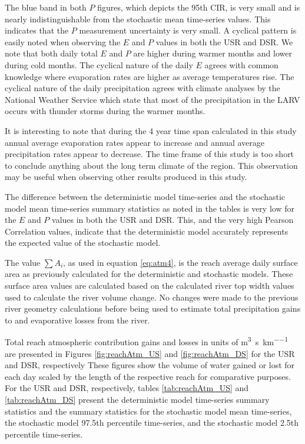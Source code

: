 \begin{linenumbers}
The blue band in both $ P $ figures, which depicts the 95th CIR, is very small and is nearly indistinguishable from the stochastic mean time-series values.  This indicates that the $ P $ measurement uncertainty is very small.  A cyclical pattern is easily noted when observing the $ E $ and $ P $ values in both the USR and DSR.  We note that both daily total $ E $ and $ P $ are higher during warmer months and lower during cold months.  The cyclical nature of the daily $ E $ agrees with common knowledge where evaporation rates are higher as average temperatures rise.  The cyclical nature of the daily precipitation agrees with climate analyses by the National Weather Service which state that most of the precipitation in the LARV occurs with thunder storms during the warmer months.

It is interesting to note that during the 4 year time span calculated in this study annual average evaporation rates appear to increase and annual average precipitation rates appear to decrease.  The time frame of this study is too short to conclude anything about the long term climate of the region.  This observation may be useful when observing other results produced in this study.

The difference between the deterministic model time-series and the stochastic model mean time-series summary statistics as noted in the tables is very low for the $ E $ and $ P $ values in both the USR and DSR.  This, and the very high Pearson Correlation values, indicate that the deterministic model accurately represents the expected value of the stochastic model.

The value $ \displaystyle \sum A_i  $, as used in equation \ref{eq:atm4}, is the reach average daily surface area as previously calculated for the deterministic and stochastic models.  These surface area values are calculated based on the calculated river top width values used to calculate the river volume change.  No changes were made to the previous river geometry calculations before being used to estimate total precipitation gains to and evaporative losses from the river.

Total reach atmospheric contribution gains and losses in units of \si{\cubic\meter\per\second\per\kilo\meter} are presented in Figures \ref{fig:reachAtm_US} and \ref{fig:reachAtm_DS} for the USR and DSR, respectively  These figures show the volume of water gained or lost for each day scaled by the length of the respective reach for comparative purposes.  For the USR and DSR, respectively, tables \ref{tab:reachAtm_US} and \ref{tab:reachAtm_DS} present the deterministic model time-series summary statistics and the summary statistics for the stochastic model mean time-series, the stochastic model 97.5th percentile time-series, and the stochastic model 2.5th percentile time-series.


\end{linenumbers}
